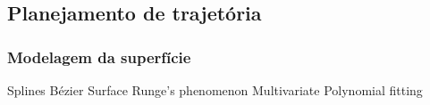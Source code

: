 \subsection{Planejamento de trajetória}

\subsubsection{Modelagem da superfície}\label{modelagem}

Splines
Bézier Surface
Runge's phenomenon
Multivariate Polynomial fitting



